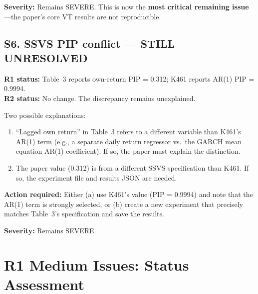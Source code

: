 \documentclass[12pt,a4paper]{article}
\begin{document}
\textbf{Severity:} \textcolor{errorred}{Remains SEVERE.} This is now the \textbf{most critical remaining issue}---the paper's core VT results are not reproducible.

\bigskip

\subsection*{\textcolor{errorred}{S6. SSVS PIP conflict --- STILL UNRESOLVED}}

\textbf{R1 status:} Table~3 reports own-return PIP = 0.312; K461 reports AR(1) PIP = 0.9994.\\
\textbf{R2 status:} \textcolor{errorred}{No change.} The discrepancy remains unexplained.

Two possible explanations:
\begin{enumerate}[nosep]
\item ``Lagged own return'' in Table~3 refers to a different variable than K461's AR(1) term (e.g., a separate daily return regressor vs.\ the GARCH mean equation AR(1) coefficient). If so, the paper must explain the distinction.
\item The paper value (0.312) is from a different SSVS specification than K461. If so, the experiment file and results JSON are needed.
\end{enumerate}

\textbf{Action required:} Either (a) use K461's value (PIP = 0.9994) and note that the AR(1) term is strongly selected, or (b) create a new experiment that precisely matches Table~3's specification and save the results.

\textbf{Severity:} \textcolor{errorred}{Remains SEVERE.}


\section*{R1 Medium Issues: Status Assessment}
\end{document}

